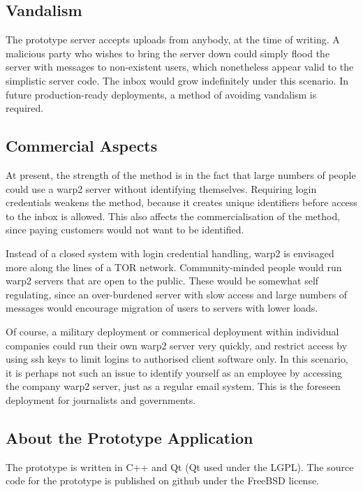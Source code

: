 \pdfoutput=1 \documentclass{article}
\begin{document}
  



\subsection{Vandalism \label{sec:vandalism}}
The prototype server accepts uploads from anybody, at the time of writing.  A malicious party who wishes to bring the server down could simply flood the server with messages to non-existent users, which nonetheless appear valid to the simplistic server code.  The inbox would grow indefinitely under this scenario.  In future production-ready deployments, a method of avoiding vandalism is required.

\subsection{Commercial Aspects}
At present, the strength of the method is in the fact that large numbers of people could use a warp2 server without identifying themselves.  Requiring login credentials weakens the method, because it creates unique identifiers before access to the inbox is allowed.  This also affects the commercialisation of the method, since paying customers would not want to be identified.

Instead of a closed system with login credential handling, warp2 is envisaged more along the lines of a TOR network.  Community-minded people would run warp2 servers that are open to the public.  These would be somewhat self regulating, since an over-burdened server with slow access and large numbers of messages would encourage migration of users to servers with lower loads.

Of course, a military deployment or commerical deployment within individual companies could run their own warp2 server very quickly, and restrict access by using ssh keys to limit logins to authorised client software only.  In this scenario, it is perhaps not such an issue to identify yourself as an employee by accessing the company warp2 server, just as a regular email system.  This is the foreseen deployment for journalists and governments.

\subsection{About the Prototype Application}
The prototype is written in C++ and Qt (Qt used under the LGPL).  The source code for the prototype is published on github \cite{WARP2_GITHUB} under the FreeBSD license.
\end{document}
